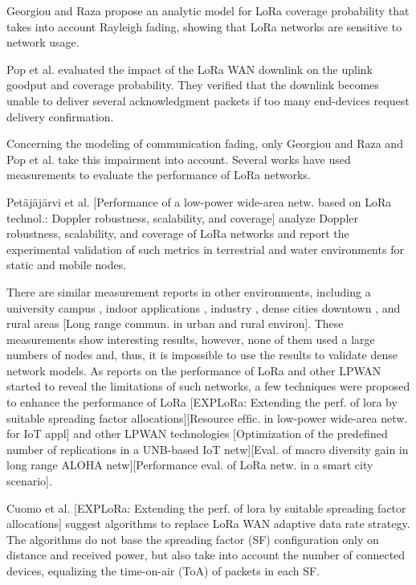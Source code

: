Georgiou and Raza \cite{georgiou_low_2017} propose an analytic model for LoRa coverage probability that takes into account Rayleigh fading,
	showing that LoRa networks are sensitive to network usage.

Pop et al.
\cite{pop_does_2017} evaluated the impact of the LoRa WAN downlink on the uplink goodput and coverage probability.
They verified that the downlink becomes unable to deliver several acknowledgment packets if too many end-devices request delivery confirmation.

Concerning the modeling of communication fading,
	only Georgiou and Raza \cite{georgiou_low_2017} and Pop et al.
\cite{pop_does_2017} take this impairment into account.
Several works have used measurements to evaluate the performance of LoRa networks.

Petäjäjärvi et al.
[Performance of a low-power wide-area netw.
based on LoRa technol.:
	Doppler robustness,
	scalability,
	and coverage] analyze Doppler robustness,
	scalability,
	and coverage of LoRa networks and report the experimental validation of such metrics in terrestrial and water environments for static and mobile nodes.

There are similar measurement reports in other environments,
	including a university campus \cite{wang_performance_2017},
	indoor applications \cite{neumann_indoor_2016},
	industry \cite{angrisani_lora_2017},
	dense cities downtown \cite{jorke_urban_2017},
	and rural areas [Long range commun.
in urban and rural environ].
These measurements show interesting results,
	however,
	none of them used a large numbers of nodes and,
	thus,
	it is impossible to use the results to validate dense network models.
As reports on the performance of LoRa and other LPWAN started to reveal the limitations of such networks,
	a few techniques were proposed to enhance the performance of LoRa [EXPLoRa:
	Extending the perf.
of lora by suitable spreading factor allocations]\cite{bor_lora_2017}[Resource efﬁc.
in low-power wide-area netw.
for IoT appl] and other LPWAN technologies [Optimization of the predeﬁned number of replications in a UNB-based IoT netw][Eval.
of macro diversity gain in long range ALOHA netw][Performance eval.
of LoRa netw.
in a smart city scenario].

Cuomo et al.
[EXPLoRa:
	Extending the perf.
of lora by suitable spreading factor allocations] suggest algorithms to replace LoRa WAN adaptive data rate strategy.
The algorithms do not base the spreading factor (SF) configuration only on distance and received power,
	but also take into account the number of connected devices,
	equalizing the time-on-air (ToA) of packets in each SF.


